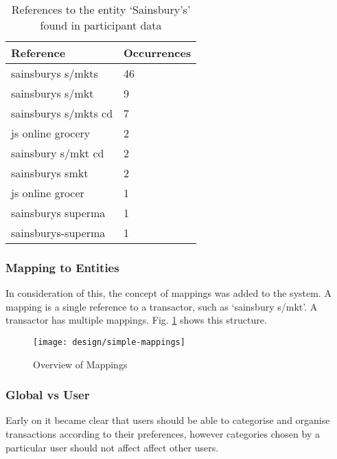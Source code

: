 \begin{table}[h]
\centering
\begin{tabular}{@{}ll@{}}
\toprule
Reference            & Occurrences \\ \midrule
sainsburys s/mkts    & 46          \\
sainsburys s/mkt     & 9           \\
sainsburys s/mkts cd & 7           \\
js online grocery    & 2           \\
sainsbury s/mkt cd   & 2           \\
sainsburys smkt      & 2           \\
js online grocer     & 1           \\
sainsburys superma   & 1           \\
sainsburys-superma   & 1           \\ \bottomrule
\end{tabular}
\caption{References to the entity `Sainsbury's' found in participant data}
\label{tab:sainsburys}
\end{table}

\subsubsection{Mapping to Entities}
In consideration of this, the concept of mappings was added to the system. A \gls{mapping} is a single \gls{reference} to a transactor, such as `sainsbury s/mkt'. A transactor has multiple mappings. Fig. \ref{fig:mapping} shows this structure.

\begin{figure}[h]
    \centering
    \texttt{[image: design/simple-mappings]}
    \caption{Overview of Mappings}
    \label{fig:mapping}
    
    \begin{comment}
[Transaction]<>*-[TransactorMapping]
[TransactorMapping]<>*-[Transactor]
    \end{comment}
\end{figure}


\subsubsection{Global vs User}
Early on it became clear that users should be able to categorise and organise transactions according to their preferences, however categories chosen by a particular user should not affect affect other users.

